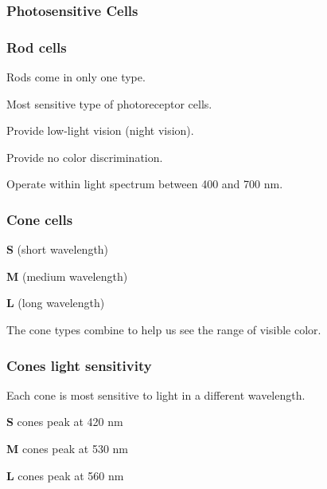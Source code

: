 \documentclass[12pt]{beamer}\usepackage[]{graphicx}\usepackage[]{color}
\begin{document}

\begin{frame}
\frametitle{Photosensitive Cells}
\begin{center}
\end{center}
\end{frame}


\begin{frame}
\frametitle{Rod cells}

\bbi
  \item Rods come in only one type.
  \item Most sensitive type of photoreceptor cells.
  \item Provide low-light vision (night vision).
  \item Provide no color discrimination.
  \item Operate within light spectrum between 400 and 700 nm.
\ei

\end{frame}


\begin{frame}
\frametitle{Cone cells}

\bbi
  \item \textbf{S} (short wavelength)
  \item \textbf{M} (medium wavelength)
  \item \textbf{L} (long wavelength)
  \item The cone types combine to help us see the range of visible color.
\ei
\eb

\end{frame}


\begin{frame}
\frametitle{Cones light sensitivity}

\bbi
  \item Each cone is most sensitive to light in a different wavelength.
  \item \textbf{S} cones peak at 420 nm
  \item \textbf{M} cones peak at 530 nm
  \item \textbf{L} cones peak at 560 nm
\ei
\eb

\end{frame}
\end{document}

